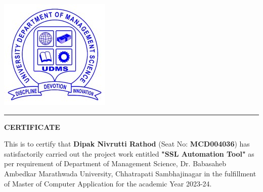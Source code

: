 {\begin{minipage}{\dimexpr\textwidth-2\fboxsep-2\fboxrule\relax}
\begin{center}
\begin{minipage}{0.12\textwidth}
        \includegraphics[width=\linewidth]{Images/udms-logo.png}
    \end{minipage}
\end{center}

\vspace{0.2cm}
\noindent\rule{\linewidth}{1pt}
\vspace{1.5cm}

\begin{center}
    \textbf{\LARGE CERTIFICATE}
\end{center}

\vspace{1.2cm}

\begin{center}
\begin{minipage}{0.9\textwidth}
\large
This is to certify that \textbf{Dipak Nivrutti Rathod} (Seat No: \textbf{MCD004036}) has satisfactorily carried out the project work entitled \textbf{"SSL Automation Tool"} as per requirement of Department of Management Science, Dr. Babasaheb Ambedkar Marathwada University, Chhatrapati Sambhajinagar in the fulfillment of Master of Computer Application for the academic Year 2023-24.
\end{minipage}
\end{center}

\vspace{3cm}


\end{minipage}}

